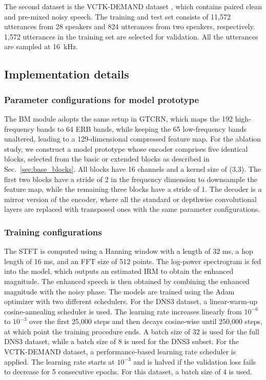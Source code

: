 \documentclass[journal]{IEEEtran}
\newcommand{\rev}[1]{#1}
\begin{document}
The second dataset is the VCTK-DEMAND dataset \cite{VCTK-DEMAND}, which contains paired clean and pre-mixed noisy speech. The training and test set consists of 11,572 utterances from 28 speakers and 824 utterances from two speakers, respectively. 1,572 utterances in the training set are selected for validation. All the utterances are sampled at \SI{16}{kHz}. 

\subsection{Implementation details}
\subsubsection{Parameter configurations for model prototype}
The BM module adopts the same setup in GTCRN, which maps the 192 high-frequency bands to 64 ERB bands, while keeping the 65 low-frequency bands unaltered, leading to a 129-dimensional compressed feature map. 
\rev{For the ablation study, we construct a model prototype whose encoder comprises five identical blocks, selected from the basic or extended blocks as described in Sec.~\ref{sec:base_blocks}.} All blocks have 16 channels and a kernel size of (3,3). The first two blocks have a stride of 2 in the frequency dimension to downsample the feature map, while the remaining three blocks have a stride of 1. The decoder is a mirror version of the encoder, where all the standard or depthwise convolutional layers are replaced with transposed ones with the same parameter configurations. 

\subsubsection{Training configurations}
The STFT is computed using a Hanning window with a length of 32 ms, a hop length of 16 ms, and an FFT size of 512 points. The log-power spectrogram is fed into the model, which outputs an estimated IRM to obtain the enhanced magnitude. The enhanced speech is then obtained by combining the enhanced magnitude with the noisy phase. The models are trained using the Adam optimizer \cite{Adam} with two different schedulers. For the DNS3 dataset, a linear-warm-up cosine-annealing scheduler is used. The learning rate increases linearly from $10^{-6}$ to $10^{-3}$ over the first 25,000 steps and then decays cosine-wise until 250,000 steps, at which point the training procedure ends. A batch size of 32 is used for the full DNS3 dataset, while a batch size of 8 is used for the DNS3 subset. For the VCTK-DEMAND dataset, a performance-based learning rate scheduler is applied. The learning rate starts at $10^{-3}$ and is halved if the validation loss fails to decrease for 5 consecutive epochs. For this dataset, a batch size of 4 is used.
\end{document}
